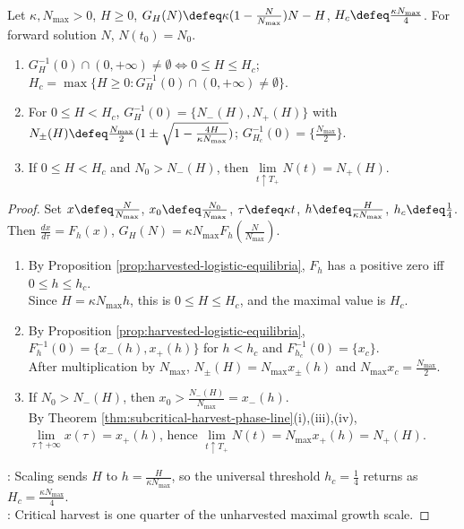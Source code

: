 \begin{corollary} \label{cor:critical-logistic-harvest} \\
Let $\kappa,N_{\max}>0$, $H\geq0$, $G_H(N)\defeq\kappa(1-\frac{N}{N_{\max}})N-H$, $H_c\defeq\frac{\kappa N_{\max}}4$. For forward solution $N$, $N(t_0)=N_0$.
\begin{enumerate}[label=(\roman*)]
\setlength{\itemsep}{0pt}
\item $G_H^{-1}(0)\cap(0,+\infty)\neq\emptyset \iff 0\leq H\leq H_c$; $H_c=\max\{H\geq0:G_H^{-1}(0)\cap(0,+\infty)\neq\emptyset\}$.
\item For $0\leq H<H_c$, $G_H^{-1}(0)=\{N_-(H),N_+(H)\}$ with $N_\pm(H)\defeq\frac{N_{\max}}2(1\pm\sqrt{1-\frac{4H}{\kappa N_{\max}}})$; $G_{H_c}^{-1}(0)=\{\frac{N_{\max}}2\}$.
\item If $0\leq H<H_c$ and $N_0>N_-(H)$, then $\lim\limits_{t\uparrow T_+}N(t)=N_+(H)$.
\end{enumerate}
\begin{proof}
Set $x\defeq\frac{N}{N_{\max}}$, $x_0\defeq\frac{N_0}{N_{\max}}$, $\tau\defeq\kappa t$, $h\defeq\frac{H}{\kappa N_{\max}}$, $h_c\defeq\frac14$. Then $\frac{dx}{d\tau}=F_h(x)$, $G_H(N)=\kappa N_{\max}F_h(\frac{N}{N_{\max}})$.
\begin{enumerate}[label=(\roman*)]
\setlength{\itemsep}{0pt}
\item By Proposition \ref{prop:harvested-logistic-equilibria}, $F_h$ has a positive zero iff $0\leq h\leq h_c$.\\
Since $H=\kappa N_{\max}h$, this is $0\leq H\leq H_c$, and the maximal value is $H_c$.
\item By Proposition \ref{prop:harvested-logistic-equilibria}, $F_h^{-1}(0)=\{x_-(h),x_+(h)\}$ for $h<h_c$ and $F_{h_c}^{-1}(0)=\{x_c\}$.\\
After multiplication by $N_{\max}$, $N_\pm(H)=N_{\max}x_\pm(h)$ and $N_{\max}x_c=\frac{N_{\max}}2$.
\item If $N_0>N_-(H)$, then $x_0>\frac{N_-(H)}{N_{\max}}=x_-(h)$.\\
By Theorem \ref{thm:subcritical-harvest-phase-line}(i),(iii),(iv), $\lim\limits_{\tau\uparrow +\infty}x(\tau)=x_+(h)$, hence $\lim\limits_{t\uparrow T_+}N(t)=N_{\max}x_+(h)=N_+(H)$.
\end{enumerate}
: Scaling sends $H$ to $h=\frac{H}{\kappa N_{\max}}$, so the universal threshold $h_c=\frac14$ returns as $H_c=\frac{\kappa N_{\max}}4$.\\
: Critical harvest is one quarter of the unharvested maximal growth scale.
\end{proof}
\end{corollary}
